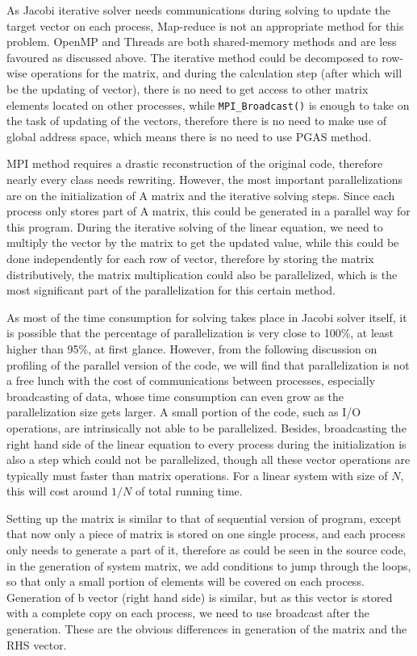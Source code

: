 \documentclass{article}
\begin{document}
\begin{spacing}{1.1}
As Jacobi iterative solver needs communications during solving to update the target vector on each process, Map-reduce is not an appropriate method for this problem. OpenMP and Threads are both shared-memory methods and are less favoured as discussed above. The iterative method could be decomposed to row-wise operations for the matrix, and during the calculation step (after which will be the updating of vector), there is no need to get access to other matrix elements located on other processes, while \texttt{MPI\_Broadcast()} is enough to take on the task of updating of the vectors, therefore there is no need to make use of global address space, which means there is no need to use PGAS method.

MPI method requires a drastic reconstruction of the original code, therefore nearly every class needs rewriting. However, the most important parallelizations are on the initialization of A matrix and the iterative solving steps. Since each process only stores part of A matrix, this could be generated in a parallel way for this program. During the iterative solving of the linear equation, we need to multiply the vector by the matrix to get the updated value, while this could be done independently for each row of vector, therefore by storing the matrix distributively, the matrix multiplication could also be parallelized, which is the most significant part of the parallelization for this certain method.

As most of the time consumption for solving takes place in Jacobi solver itself, it is possible that the percentage of parallelization is very close to 100\%, at least higher than 95\%, at first glance. However, from the following discussion on profiling of the parallel version of the code, we will find that parallelization is not a free lunch with the cost of communications between processes, especially broadcasting of data, whose time consumption can even grow as the parallelization size gets larger. A small portion of the code, such as I/O operations, are intrinsically not able to be parallelized. Besides, broadcasting the right hand side of the linear equation to every process during the initialization is also a step which could not be parallelized, though all these vector operations are typically must faster than matrix operations. For a linear system with size of $N$, this will cost around $1/N$ of total running time.

Setting up the matrix is similar to that of sequential version of program, except that now only a piece of matrix is stored on one single process, and each process only needs to generate a part of it, therefore as could be seen in the source code, in the generation of system matrix, we add conditions to jump through the loops, so that only a small portion of elements will be covered on each process. Generation of b vector (right hand side) is similar, but as this vector is stored with a complete copy on each process, we need to use broadcast after the generation. These are the obvious differences in generation of the matrix and the RHS vector.


\end{spacing}
\end{document}
